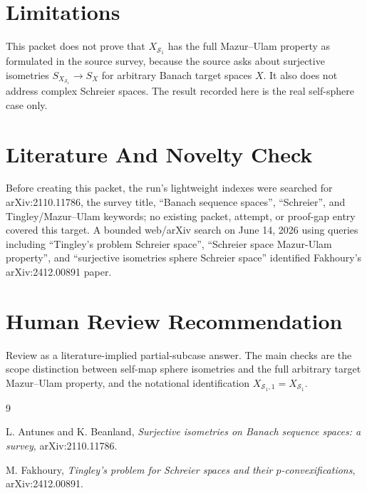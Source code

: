 \documentclass[11pt]{article}
\newcommand{\Sc}{\mathcal{S}}
\begin{document}
\section*{Limitations}

This packet does not prove that $X_{\Sc_1}$ has the full Mazur--Ulam property
as formulated in the source survey, because the source asks about
surjective isometries $S_{X_{\Sc_1}}\to S_X$ for arbitrary Banach target spaces
$X$.  It also does not address complex Schreier spaces.  The result recorded
here is the real self-sphere case only.

\section*{Literature And Novelty Check}

Before creating this packet, the run's lightweight indexes were searched for
arXiv:2110.11786, the survey title, ``Banach sequence spaces'', ``Schreier'',
and Tingley/Mazur--Ulam keywords; no existing packet, attempt, or proof-gap
entry covered this target.  A bounded web/arXiv search on June 14, 2026 using
queries including ``Tingley's problem Schreier space'', ``Schreier space
Mazur-Ulam property'', and ``surjective isometries sphere Schreier space''
identified Fakhoury's arXiv:2412.00891 paper.

\section*{Human Review Recommendation}

Review as a literature-implied partial-subcase answer.  The main checks are the
scope distinction between self-map sphere isometries and the full arbitrary
target Mazur--Ulam property, and the notational identification
$X_{\Sc_1,1}=X_{\Sc_1}$.

\begin{thebibliography}{9}

L. Antunes and K. Beanland,
\emph{Surjective isometries on Banach sequence spaces: a survey},
arXiv:2110.11786.

M. Fakhoury,
\emph{Tingley's problem for Schreier spaces and their $p$-convexifications},
arXiv:2412.00891.

\end{thebibliography}
\end{document}
